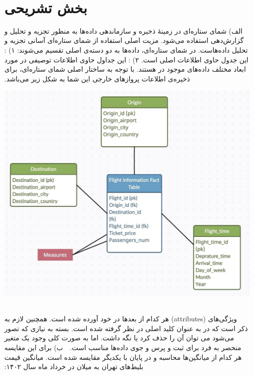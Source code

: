 ‫
‫‫\section*{بخش تشریحی}
‫
‫الف) شمای ستاره‌ای در زمینهٔ ذخیره و سازماندهی داده‌ها به منظور تجزیه و تحلیل و گزارش‌دهی استفاده می‌شود. مزیت اصلی استفاده از شمای ستاره‌ای آسانی  تجزیه و تحلیل داده‌هاست. در شمای ستاره‌ای، داده‌ها به دو دسته‌ی اصلی تقسیم می‌شوند: \newline
‫۱) : این جدول حاوی اطلاعات اصلی است. \newline
‫۲) : این جداول حاوی اطلاعات توصیفی در مورد ابعاد مختلف داده‌های موجود در  هستند. \newline
‫با توجه به ساختار اصلی شمای‌ ستاره‌ای، برای ذخیره‌ی اطلاعات پروازهای خارجی این شما به شکل زیر می‌باشد.
‫
‫\begin{center}
‫\includegraphics[scale=0.35]{figs/star_schema1.png}
‫\end{center}
‫
‫ویژگی‌های (attributes) هر کدام از بعدها در  خود آورده شده است. همچنین لازم به ذکر است که  در  به عنوان کلید اصلی در نظر گرفته شده است. بسته به نیازی که تصور می‌شود می توان آن را حذف کرد یا نگه داشت. اما به صورت کلی وجود یک متغیر منحصر به فرد برای ثبت و پرس و جوی داده‌ها مناسب است.
‫\vspace{1cm}
‫
‫ب)  برای این مقایسه هر کدام از میانگین‌ها محاسبه و در پایان با یکدیگر مقایسه شده است. \newline
‫میانگین قیمت بلیط‌های تهران به میلان در خرداد ماه سال ۱۴۰۲: \newline
